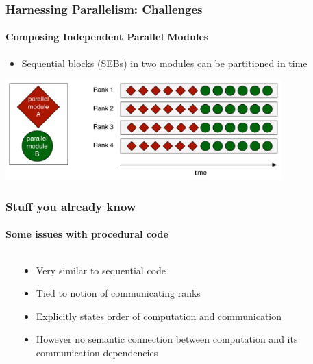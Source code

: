 \begin{frame}[fragile]
\frametitle{Harnessing Parallelism: Challenges}
\framesubtitle{Composing Independent Parallel Modules}
  \begin{itemize}
    \item Sequential blocks (SEBs) in two modules can be partitioned in time
  \end{itemize}
  \begin{center}
    \includegraphics[width=0.8\textwidth]{figures/timeDivision.pdf}
  \end{center}
\end{frame}

\begin{frame}[fragile]
\frametitle{Stuff you already know}
\framesubtitle{Some issues with procedural code}

  \begin{columns}
    \begin{column}{0.4\textwidth}
      
    \end{column}
    \begin{column}{0.6\textwidth}
      \begin{itemize}
      \item Very similar to sequential code
      \item Tied to notion of communicating ranks
      \item Explicitly states order of computation and communication
      \item However no semantic connection between computation and its communication dependencies
      \end{itemize}
    \end{column}
  \end{columns}

\end{frame}

